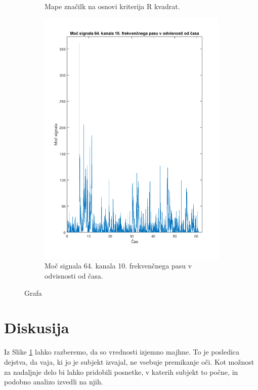 \documentclass{article}
\begin{document}
\begin{figure}[H]
\begin{subfigure}{0.49\linewidth}
        \caption{Mape značilk na osnovi kriterija R kvadrat.}\label{fig:r2}
    \end{subfigure}
   \begin{subfigure}{0.49\linewidth}
        \centering
        \includegraphics[width=\textwidth]{power.png}
        \caption{Moč signala 64. kanala 10. frekvenčnega pasu v odvisnosti od časa.}\label{fig:power}
    \end{subfigure}
    \caption{Grafa}\label{fig:graphs}
\end{figure}


\section{Diskusija}
\label{sec:discussion}

Iz Slike \ref{fig:r2} lahko razberemo, da so vrednosti izjemno majhne. To je posledica dejstva, da vaja, ki jo je subjekt izvajal, ne vsebuje premikanje oči. Kot možnost za nadaljnje delo bi lahko pridobili posnetke, v katerih subjekt to počne, in podobno analizo izvedli na njih.
\end{document}
